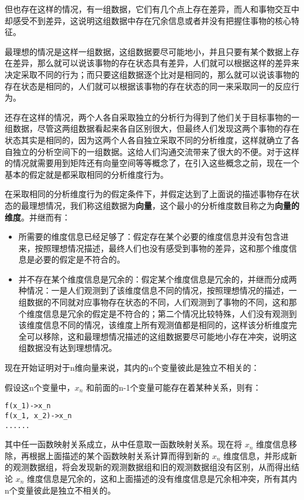 \documentclass[12pt,oneside]{book}
\begin{document}
但也存在这样的情况，有一组数据，它们有几个点上存在差异，而人和事物交互中却感受不到差异，这说明这组数据中存在冗余信息或者并没有把握住事物的核心特征。

最理想的情况是这样一组数据，这组数据要尽可能地小，并且只要有某个数据上存在差异，那么就可以说该事物的存在状态具有差异，人们就可以根据这样的差异来决定采取不同的行为；而只要这组数据逐个比对是相同的，那么就可以说该事物的存在状态是相同的，人们就可以根据该事物的存在状态的同一来采取同一的反应行为。

还存在这样的情况，两个人各自采取独立的分析行为得到了他们关于目标事物的一组数据，尽管这两组数据看起来各自区别很大，但最终人们发现这两个事物的存在状态其实是相同的，因为这两个人各自独立采取不同的分析维度，这样就确立了各自独立的分析空间下的一组数据。这给人们沟通交流带来了很大的不便。对于这样的情况就需要用到矩阵还有向量空间等等概念了，在引入这些概念之前，现在一个基本的假定就是都采取相同的分析维度行为。

在采取相同的分析维度行为的假定条件下，并假定达到了上面说的描述事物存在状态的最理想情况，我们称这组数据为\textbf{向量}，这个最小的分析维度数目称之为\textbf{向量的维度}。并继而有：

\begin{itemize}
\item 所需要的维度信息已经足够了：假定存在某个必要的维度信息并没有包含进来，按照理想情况描述，最终人们也没有感受到事物的差异，这和那个维度信息是必要的假定是不符合的。
\item 并不存在某个维度信息是冗余的：假定某个维度信息是冗余的，并继而分成两种情况：一是人们观测到了该维度信息不同的情况，按照理想情况的描述，一组数据的不同就对应事物存在状态的不同，人们观测到了事物的不同，这和那个维度信息是冗余的假定是不符合的；第二个情况比较特殊，人们没有观测到该维度信息不同的情况，该维度上所有观测值都是相同的，这样该分析维度完全可以移除，这和最理想情况描述的这组数据要尽可能地小存在冲突，说明这组数据没有达到理想情况。
\end{itemize}

现在开始证明对于n维向量来说，其内的n个变量彼此是独立不相关的：

假设这n个变量中，$x_n$ 和前面的n-1个变量可能存在着某种关系，则有：

\begin{Verbatim}
f(x_1)->x_n
f(x_1, x_2)->x_n
......
\end{Verbatim}

其中任一函数映射关系成立，从中任意取一函数映射关系。现在将 $x_n$ 维度信息移除，再根据上面描述的某个函数映射关系计算而得到新的 $x_n$ 维度信息，并形成新的观测数据组，将会发现新的观测数据组和旧的观测数据组没有区别，从而得出结论 $x_n$ 维度信息是冗余的，这和上面描述的没有维度信息是冗余相冲突，所有其内n个变量彼此是独立不相关的。
\end{document}
